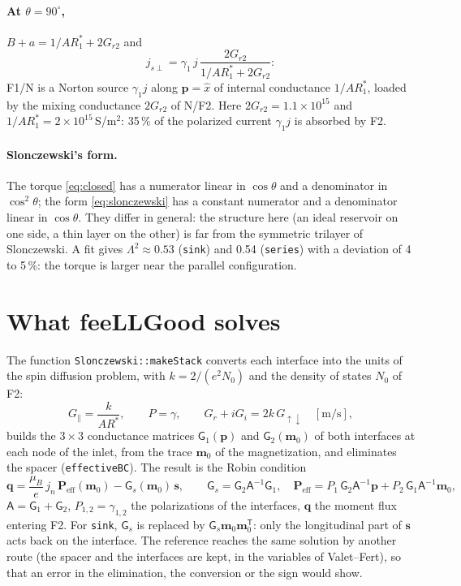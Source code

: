 \documentclass[11pt,a4paper]{article}
\newcommand{\vm}{\bm{m}}
\newcommand{\vp}{\bm{p}}
\newcommand{\vs}{\bm{s}}
\begin{document}
\paragraph{At $\theta = 90^\circ$,} $B + a = 1/AR_1^* + 2G_{r2}$ and
\begin{equation}
  j_{s\perp} = \gamma_1\,j\,\frac{2G_{r2}}{1/AR_1^* + 2G_{r2}} :
\end{equation}
F1/N is a Norton source $\gamma_1j$ along $\vp = \hat x$ of internal
conductance $1/AR_1^*$, loaded by the mixing conductance $2G_{r2}$ of N/F2.
Here $2G_{r2} = 1.1\times10^{15}$ and $1/AR_1^* = 2\times10^{15}$\,S/m$^2$:
35\,\% of the polarized current $\gamma_1 j$ is absorbed by F2.

\paragraph{Slonczewski's form.} The torque \eqref{eq:closed} has a
numerator linear in $\cos\theta$ and a denominator in $\cos^2\theta$; the
form \eqref{eq:slonczewski} has a constant numerator and a denominator
linear in $\cos\theta$. They differ in general: the structure here (an
ideal reservoir on one side, a thin layer on the other) is far from the
symmetric trilayer of Slonczewski. A fit gives $\Lambda^2 \approx 0.53$
(\texttt{sink}) and 0.54 (\texttt{series}) with a deviation of 4 to 5\,\%:
the torque is larger near the parallel configuration.

\section{What feeLLGood solves}
\label{sec:feellgood}

The function \texttt{Slonczewski::makeStack} converts each interface into
the units of the spin diffusion problem, with $k = 2/(e^2N_0)$ and the
density of states $N_0$ of F2:
\begin{equation}
  G_\parallel = \frac{k}{AR^*},\qquad P = \gamma,\qquad
  G_r + iG_i = 2k\,G_{\uparrow\downarrow}\quad[\mathrm{m/s}] ,
\end{equation}
builds the $3\times3$ conductance matrices $\mathsf{G}_1(\vp)$ and
$\mathsf{G}_2(\vm_0)$ of both interfaces at each node of the inlet, from
the trace $\vm_0$ of the magnetization, and eliminates the spacer
(\texttt{effectiveBC}). The result is the Robin condition
\begin{equation}
  \bm{q} = \frac{\mu_B}{e}\,j_n\,\bm{P}_{\mathrm{eff}}(\vm_0)
    - \mathsf{G}_s(\vm_0)\,\vs,
  \qquad
  \mathsf{G}_s = \mathsf{G}_2\mathsf{A}^{-1}\mathsf{G}_1,\quad
  \bm{P}_{\mathrm{eff}} = P_1\,\mathsf{G}_2\mathsf{A}^{-1}\vp
    + P_2\,\mathsf{G}_1\mathsf{A}^{-1}\vm_0,
\end{equation}
$\mathsf{A} = \mathsf{G}_1 + \mathsf{G}_2$, $P_{1,2} = \gamma_{1,2}$ the
polarizations of the interfaces, $\bm{q}$ the moment flux entering F2.
For \texttt{sink}, $\mathsf{G}_s$ is replaced by
$\mathsf{G}_s\vm_0\vm_0^{\mathsf{T}}$: only the longitudinal part of $\vs$
acts back on the interface. The reference reaches the same solution by
another route (the spacer and the interfaces are kept, in the variables of
Valet--Fert), so that an error in the elimination, the conversion or the
sign would show.
\end{document}
